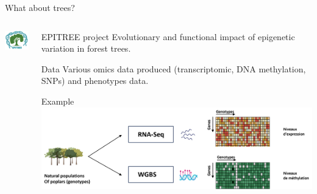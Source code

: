 \documentclass[11pt]{beamer}
\newcommand{\emphase}[1]{\textcolor{Complement}{#1}}
\begin{document}
	\begin{frame}{What about \emphase{trees}?}
		
		\begin{columns}
			\begin{column}{2.5cm}
				\includegraphics[width=2.5cm]{images/epitree.png}
			\end{column}
			\begin{column}{9.5cm}
				
				\begin{block}{EPITREE project}
					Evolutionary and functional impact of epigenetic variation in forest trees.
				\end{block}
				
				\begin{block}{\emphase{Data}}
					Various \emphase{omics} data produced (transcriptomic, DNA methylation, SNPs) and \emphase{phenotypes} data. 
				\end{block}
				
				\begin{block}{\emphase{Example}}
					\centering
					\includegraphics[width=\textwidth]{images/data-measures-methylation-transcriptome.png}
				\end{block}

			\end{column}
		\end{columns}
	\end{frame}
	
\end{document}
